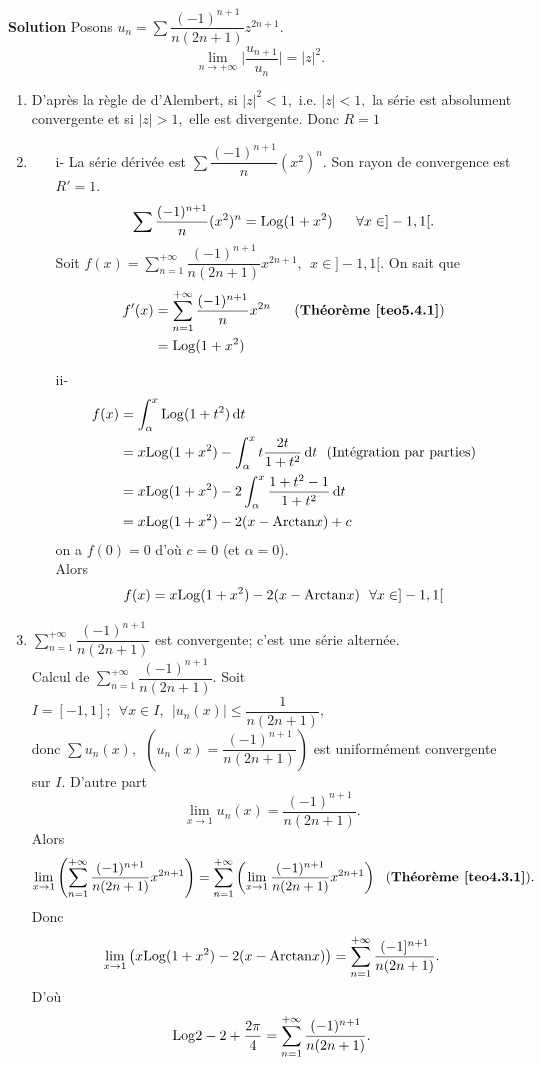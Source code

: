 \documentclass[11pt, a4paper]{book}
\begin{document}
\textbf{Solution}\quad
Posons $u_n=\sum \dfrac{(-1)^{n+1}}{n(2n+1)}z^{2n+1}.$ $$\lim_{n\rightarrow+\infty}\Big|\dfrac{u_{n+1}}{u_n}\Big|=|z|^2.$$
\begin{enumerate}
\item D'apr\`es la r\`egle de d'Alembert, si $|z|^2<1, $ i.e. $|z|<1,$ la s\'erie est absolument convergente et si $|z|>1,$ elle est divergente. Donc $R=1$
\item \begin{itemize}
\item[i-] La s\'erie d\'eriv\'ee est $\sum \dfrac{(-1)^{n+1}}{n}\left(x^2\right)^n.$ Son rayon de convergence est $R'=1$. 
$$\sum \dfrac{(-1)^{n+1}}{n}(x^2)^n=\mathrm{Log} (1+x^2)\quad~~\forall x\in ]-1,1[.$$
Soit ${\displaystyle f(x)=\sum_{n=1}^{+\infty}\dfrac{(-1)^{n+1}}{n(2n+1)}x^{2n+1},~~x\in ]-1,1[.}$ On sait que 
\begin{align*} f'(x)&=\sum_{n=1}^{+\infty}\dfrac{(-1)^{n+1}}{n}x^{2n} \quad~~\text{(\textbf{Th\'eor\`eme \ref{teo5.4.1}})}\\
&=\mathrm{Log}(1+x^2)
\end{align*}
\item[ii-]
\begin{align*}
f(x)&=\int_\alpha^x\mathrm{Log} (1+t^2)\,\mathrm{d} t\\
&=x\mathrm{Log} (1+x^2)-\int_\alpha^x t\dfrac{2t}{1+t^2}\,\mathrm{d} t~~(\text{Int\'egration par parties})\\
&=x\mathrm{Log} (1+x^2)-2\int_\alpha^x\dfrac{1+t^2-1}{1+t^2}\,\mathrm{d} t\\
&=x\mathrm{Log}(1+x^2)-2(x-\mathrm{Arctan} x)+c
\end{align*}
on a $f(0)=0$ d'o\`u $c=0$ (et $\alpha=0$).\\
Alors $$f(x)=x\mathrm{Log} (1+x^2)-2(x-\mathrm{Arctan} x)~~\forall x\in ]-1,1[$$
\end{itemize}
\item ${\displaystyle\sum_{n=1}^{+\infty}\dfrac{(-1)^{n+1}}{n(2n+1)}}$ est convergente; c'est une s\'erie altern\'ee.\\
Calcul de ${\displaystyle\sum_{n=1}^{+\infty}\dfrac{(-1)^{n+1}}{n(2n+1)}.}$ Soit $I=[-1,1];~~\forall x\in I,~~|u_n(x)|\leq\dfrac{1}{n(2n+1)},$ \\donc ${\displaystyle\sum u_n(x),~~\left(u_n(x)=\dfrac{(-1)^{n+1}}{n(2n+1)}\right)}$ est uniform\'ement convergente sur $I$. 
D'autre part $$\lim_{x\rightarrow1}u_n(x)=\dfrac{(-1)^{n+1}}{n(2n+1)}.$$ Alors $$\lim_{x\rightarrow1}\left(\sum_{n=1}^{+\infty}\dfrac{(-1)^{n+1}}{n(2n+1)}x^{2n+1}\right)=\sum_{n=1}^{+\infty}\left(\lim_{x\rightarrow1}\dfrac{(-1)^{n+1}}{n(2n+1)}x^{2n+1}\right)~~(\text{\textbf{Th\'eor\`eme \ref{teo4.3.1}}}).$$
Donc $$\lim_{x\rightarrow1}\left(x\mathrm{Log}(1+x^2)-2(x-\mathrm{Arctan} x)\right)=\sum_{n=1}^{+\infty}\dfrac{(-1]^{n+1}}{n(2n+1)}.$$ D'o\`u $$\mathrm{Log}2-2+\dfrac{2\pi}{4}=\sum_{n=1}^{+\infty}\dfrac{(-1)^{n+1}}{n(2n+1)}.$$
\end{enumerate}
\end{document}
